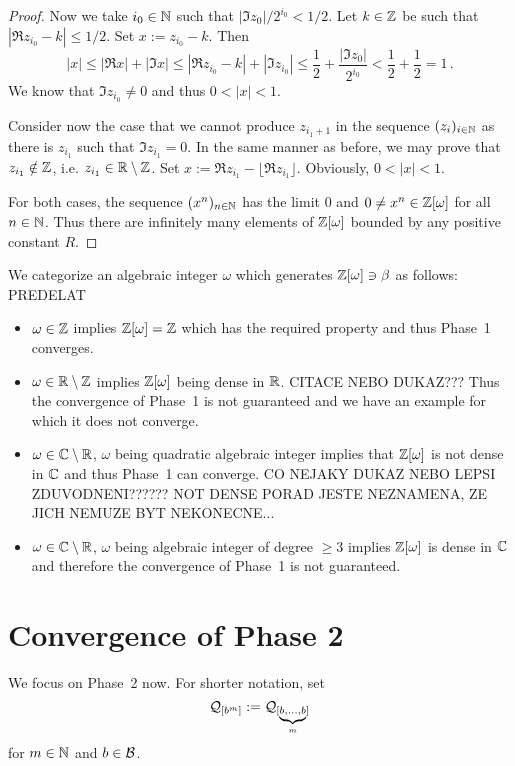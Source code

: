 \begin{proof}
Now we take $i_0\in\mathbb{N}$ such that $|\Im z_0|/2^{i_0}< 1/2$. Let $k\in\mathbb{Z}$ be such that $|\Re z_{i_0} -k|\leq 1/2$. Set $x:= z_{i_0}-k$. Then
$$
|x|\leq |\Re x| +|\Im x| \leq  |\Re z_{i_0} -k| + |\Im z_{i_0}| \leq \frac{1}{2} + \frac{|\Im z_0|}{2^{i_0}} < \frac{1}{2} +\frac{1}{2}=1\,.
$$
We know that $\Im z_{i_0} \neq 0$ and thus $0<|x|<1$.

Consider now the case that we cannot produce $z_{i_1+1}$ in the sequence $(z_i)_{i\in\mathbb{N}}$ as there is $z_{i_1}$ such that $\Im z_{i_1} = 0$. In the same manner as before, we may prove that $z_{i_1} \notin \mathbb{Z}$, i.e. $z_{i_1} \in \mathbb{R}\setminus \mathbb{Z}$. Set $x:= \Re z_{i_1}- \lfloor \Re z_{i_1} \rfloor$. Obviously, $0<|x|<1$.

For both cases, the sequence $(x^n)_{n\in\mathbb{N}}$ has the limit 0 and $0\neq x^n\in\mathbb{Z}[\omega]$ for all $n\in\mathbb{N}$. Thus there are infinitely many elements of $\mathbb{Z}[\omega]$ bounded by any positive constant $R$. 
\end{proof}


We categorize an algebraic integer $\omega$ which generates $\mathbb{Z}[\omega] \ni \beta$ as follows:
PREDELAT
\begin{itemize}
    \item $\omega \in \mathbb{Z}$ implies $\mathbb{Z}[\omega]=\mathbb{Z}$ which has the required property and thus Phase~1 converges.
    \item $\omega \in \mathbb{R}\setminus\mathbb{Z}$ implies $\mathbb{Z}[\omega]$ being dense in $\mathbb{R}$. CITACE NEBO DUKAZ??? Thus the convergence of Phase~1 is not guaranteed and we have an example for which it does not converge.
    \item $\omega \in \mathbb{C}\setminus\mathbb{R}$, $\omega$ being quadratic algebraic integer implies that $\mathbb{Z}[\omega]$ is not dense in $\mathbb{C}$ and thus Phase~1 can converge. CO NEJAKY DUKAZ NEBO LEPSI ZDUVODNENI?????? NOT DENSE PORAD JESTE NEZNAMENA, ZE JICH NEMUZE BYT NEKONECNE...
    \item $\omega \in \mathbb{C}\setminus\mathbb{R}$, $\omega$ being algebraic integer of degree $\geq 3$ implies $\mathbb{Z}[\omega]$ is  dense in $\mathbb{C}$ and therefore the convergence of Phase~1 is not guaranteed.
\end{itemize}

\section{Convergence of Phase 2}
\label{sec:convergencePhase2}
We focus on Phase~2 now. For shorter notation, set 
$$
\mathcal{Q}_{[b^{m}]}:=\mathcal{Q}_{[\underbrace{\scriptstyle b,\dots,b}_m]}
$$ for $m \in \mathbb{N}$ and $b\in\mathcal{B}$.

